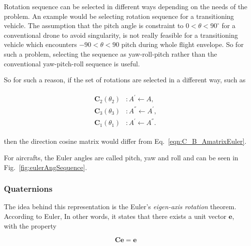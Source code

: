 Rotation sequence can be selected in different ways depending on the needs of the problem. 
An example would be selecting rotation sequence for a transitioning vehicle. The assumption that the pitch angle is constraint to $0<\theta<90^\circ$ for a conventional drone to avoid singularity, is not really feasible for a transitioning vehicle which encounters $-90<\theta<90$ pitch during whole flight envelope. So for such a problem, selecting the sequence as yaw-roll-pitch rather than the conventional yaw-pitch-roll sequence is useful. 

So for such a reason, if the set of rotations are selected in a different way, such as 

\begin{align}
\label{eqn:sequence2}
\begin{split}
{\bm{C}}_2(\theta_{2}) & :      A^{'} \leftarrow A   ,
\\
{\bm{C}}_3(\theta_{3}) & :      A^{''} \leftarrow A^{'}   ,
\\
{\bm{C}}_1(\theta_{1}) & :      A^{'} \leftarrow A^{''}  .
\end{split}
\end{align}

then the direction cosine matrix would differ from Eq.~\ref{eqn:C_B_AmatrixEuler}.

For aircrafts, the Euler angles are called pitch, yaw and roll and can be seen in Fig.~\ref{fig:eulerAngSequence}.


\subsubsection{Quaternions}

The idea behind this representation is the Euler's \emph{eigen-axis rotation} theorem. 
According to Euler,  In other words, it states that there exists a unit vector $\bm{e}$, with the property

\begin{equation}
\label{eqn:quat1}
\bm{C}\bm{e}= \bm{e}
\end{equation}

